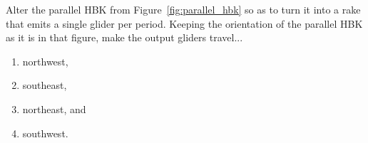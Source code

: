 \begin{multicols}{2}
\mfilbreak


\begin{problem}\label{exer:parallel_hbk_rake}
	Alter the parallel HBK from Figure~\ref{fig:parallel_hbk} so as to turn it into a rake that emits a single glider per period. Keeping the orientation of the parallel HBK as it is in that figure, make the output gliders travel...\smallskip
	
	\begin{enumerate}[label=\bf\color{ocre}(\alph*)]
		\item {} northwest,
		
		\item {} southeast,
		
		\item {} northeast, and
		
		\item {} southwest.
		
	\end{enumerate}
\end{problem}

\end{multicols}
\normalsize\vspace*{0.01cm}\ifdefined\FORPRINTING{}\else%
\fi
